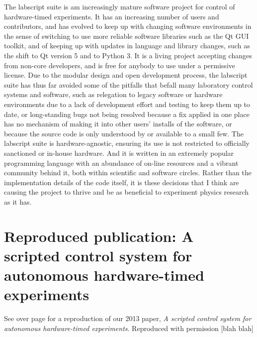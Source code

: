 The labscript suite is am increasingly mature software project for control of hardware-timed experiments. It has an increasing number of users and contributors, and has evolved to keep up with changing software environments in the sense of switching to use more reliable software libraries such as the Qt GUI toolkit, and of keeping up with updates in language and library changes, such as the shift to Qt version 5 and to Python 3. It is a living project accepting changes from non-core developers, and is free for anybody to use under a permissive license. Due to the modular design and open development process, the labscript suite has thus far avoided some of the pitfalls that befall many laboratory control systems and software, such as relegation to legacy software or hardware environments due to a lack of development effort and testing to keep them up to date, or long-standing bugs not being resolved because a fix applied in one place has no mechanism of making it into other users' installs of the software, or because the source code is only understood by or available to a small few. The labscript suite is hardware-agnostic, ensuring its use is not restricted to officially sanctioned or in-house hardware. And it is written in an extremely popular programming language with an abundance of on-line resources and a vibrant community behind it, both within scientific and software circles. Rather than the implementation details of the code itself, it is these decisions that I think are causing the project to thrive and be as beneficial to experiment physics research as it has.


\section{Reproduced publication: A scripted control system for autonomous hardware-timed experiments}

See over page for a reproduction of our 2013 paper, \emph{A scripted control system for autonomous hardware-timed experiments}. Reproduced with permission [blah blah]


